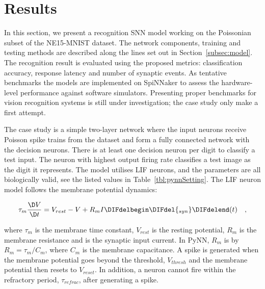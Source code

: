 \section{Results}
\label{sec:test}
In this section, we present a recognition SNN model working on the Poissonian subset of the NE15-MNIST dataset.
The network components, training and testing methods are described along the lines set out in Section~\ref{subsec:model}.
The recognition result is evaluated using the proposed metrics: classification accuracy, response latency and number of synaptic events.
As tentative benchmarks the models are implemented on SpiNNaker to assess the hardware-level performance against software simulators.
Presenting proper benchmarks for vision recognition systems is still under investigation; the case study only make a first attempt.

The case study is a simple two-layer network where the input neurons receive Poisson spike trains from the dataset and form a fully connected network with the decision neurons.
There is at least one decision neuron per digit to classify a test input.
The neuron with \DIFaddbegin {}\DIFaddend highest output firing rate classifies a test image as the digit it represents.
The model utilises LIF neurons, and the parameters are all biologically valid, see the listed values in Table~\ref{tbl:pynnSetting}.
The LIF neuron model follows the membrane potential dynamics\DIFaddbegin {}\DIFaddend :

\begin{equation}
\tau_m \frac{\D V}{\D t}=V_{rest} - V + R_{m} I\DIFdelbegin \DIFdel{_{syn}}\DIFdelend (t) ~~~,
\label{eq:LIF}
\end{equation}

where $\tau_m$ is the membrane time constant, $ V_{rest} $ is the resting potential, $ R_{m} $ is the membrane resistance and \DIFdelbegin {}\DIFdelend \DIFaddbegin {}\DIFaddend is the synaptic input current.
In PyNN, $ R_{m} $ is \DIFdelbegin {}\DIFdelend \DIFaddbegin {}\DIFaddend by $ R_{m}=\tau_m/C_{m} $, where $C_{m} $ is the membrane capacitance.
A spike is generated when the membrane potential goes beyond the threshold, $ V_{thresh} $ and the membrane potential then resets to $V_{reset}$.
In addition, a neuron cannot fire within the refractory period, $ \tau_{refrac} $, after generating a spike.

